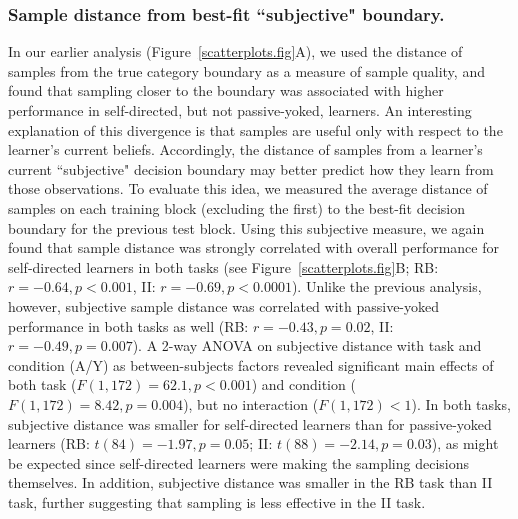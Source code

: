 \documentclass[3p,twocolumn,authoryear,10pt]{elsarticle}
\begin{document}


\subsubsection{Sample distance from best-fit ``subjective" boundary.} 
In our earlier analysis (Figure~\ref{scatterplots.fig}A), we used the distance of samples from the true category boundary as a measure of sample quality, and found that sampling closer to the boundary was associated with higher performance in self-directed, but not passive-yoked, learners. An interesting explanation of this divergence is that samples are useful only with respect to the learner's current beliefs.  Accordingly, the distance of samples from a learner's current ``subjective" decision boundary may better predict how they learn from those observations. To evaluate this idea, we measured the average distance of samples on each training block (excluding the first) to the best-fit decision boundary for the previous test block. Using this subjective measure, we again found that sample distance was strongly correlated with overall performance for self-directed learners in both tasks (see Figure~\ref{scatterplots.fig}B; RB: $r=-0.64, p<0.001$, II: $r=-0.69, p<0.0001$). Unlike the previous analysis, however, subjective sample distance was correlated with passive-yoked performance in both tasks as well (RB: $r=-0.43, p=0.02$, II: $r=-0.49, p=0.007$). A 2-way ANOVA on subjective distance with task and condition (A/Y) as between-subjects factors revealed significant main effects of both task ($F(1,172)=62.1, p<0.001$) and condition ($F(1,172)=8.42, p=0.004$), but no interaction ($F(1,172)<1$). In both tasks, subjective distance was smaller for self-directed learners than for passive-yoked learners (RB: $t(84)=-1.97, p=0.05$; II: $t(88)=-2.14, p=0.03$), as might be expected since self-directed learners were making the sampling decisions themselves. In addition, subjective distance was smaller in the RB task than II task, further suggesting that sampling is less effective in the II task.\\
\end{document}
